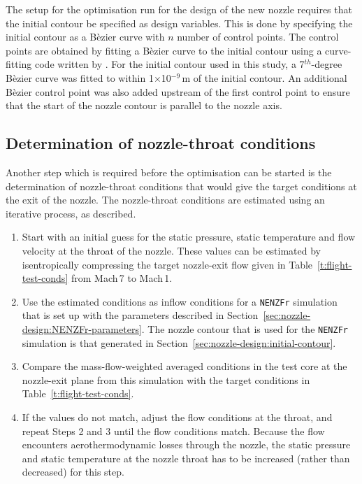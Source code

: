 \documentclass[12pt,a4paper]{article}
\begin{document}
The setup for the optimisation run for the design of the new nozzle requires 
that the initial contour be specified as design variables. This is done by 
specifying the initial contour as a B\`ezier curve with $n$ number of control 
points. The control points are obtained by fitting a B\`ezier curve to the 
initial contour using a curve-fitting code written by .
For the initial contour used in this study, a 7$^{th}$-degree B\`ezier curve 
was fitted to within 1$\times$10$^{-9}$\,m of the initial contour. An 
additional B\`ezier control point was also added upstream of the first control 
point to ensure that the start of the nozzle contour is parallel to the nozzle axis. 


\subsection{Determination of nozzle-throat conditions}
\label{sec:nozzle-design:nozzle-throat-conditions}
%
Another step which is required before the optimisation can be started is the 
determination of nozzle-throat conditions that would give the target conditions
at the exit of the nozzle. The nozzle-throat conditions are estimated using an
iterative process, as described.
%
\begin{enumerate}
 \item Start with an initial guess for the static pressure, static temperature 
       and flow velocity at the throat of the nozzle. These values can be 
       estimated by isentropically compressing the target nozzle-exit flow 
       given in Table~\ref{t:flight-test-conds} from Mach\,7 to Mach\,1.
 \item Use the estimated conditions as inflow conditions for a \texttt{NENZFr} 
       simulation that is set up with the parameters described in 
       Section~\ref{sec:nozzle-design:NENZFr-parameters}. 
       The nozzle contour that is used for the \texttt{NENZFr} simulation is 
       that generated in Section~\ref{sec:nozzle-design:initial-contour}.
 \item Compare the mass-flow-weighted averaged conditions in the test core at
       the nozzle-exit plane from this simulation with the target conditions 
       in Table~\ref{t:flight-test-conds}.
 \item If the values do not match, adjust the flow conditions at the throat, 
       and repeat Steps 2 and 3 until the flow conditions match. Because the
       flow encounters aerothermodynamic losses through the nozzle, the static
       pressure and static temperature at the nozzle throat has to be increased 
       (rather than decreased) for this step.
\end{enumerate}
\end{document}

